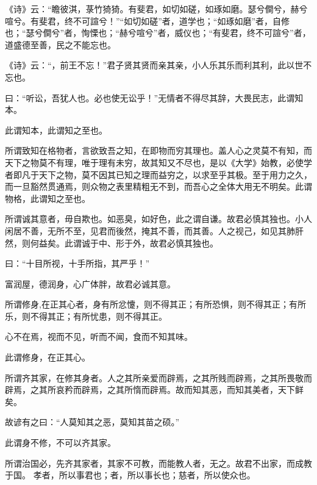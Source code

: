 \documentclass[twoside,openany]{book}
\begin{document}
\begin{pinyinscope}
《诗》云：“瞻彼淇，菉竹猗猗。有斐君，如切如磋，如琢如磨。瑟兮僴兮，赫兮喧兮。有斐君，终不可諠兮！”“如切如磋”者，道学也；“如琢如磨”者，自修也；“瑟兮僴兮”者，恂慄也；“赫兮喧兮”者，威仪也；“有斐君，终不可諠兮”者，道盛德至善，民之不能忘也。

《诗》云：“，前王不忘！”君子贤其贤而亲其亲，小人乐其乐而利其利，此以世不忘也。

曰：“听讼，吾犹人也。必也使无讼乎！”无情者不得尽其辞，大畏民志，此谓知本。

此谓知本，此谓知之至也。

所谓致知在格物者，言欲致吾之知，在即物而穷其理也。盖人心之灵莫不有知，而天下之物莫不有理，唯于理有未穷，故其知又不尽也，是以《大学》始教，必使学者即凡于天下之物，莫不因其已知之理而益穷之，以求至乎其极。至于用力之久，而一旦豁然贯通焉，则众物之表里精粗无不到，而吾心之全体大用无不明矣。此谓物格，此谓知之至也。

所谓诚其意者，毋自欺也。如恶臭，如好色，此之谓自谦。故君必慎其独也。小人闲居不善，无所不至，见君而後然，掩其不善，而其善。人之视己，如见其肺肝然，则何益矣。此谓诚于中、形于外，故君必慎其独也。

曰：“十目所视，十手所指，其严乎！”

富润屋，德润身，心广体胖，故君必诚其意。

所谓修身,在正其心者，身有所忿懥，则不得其正；有所恐惧，则不得其正；有所乐，则不得其正；有所忧患，则不得其正。

心不在焉，视而不见，听而不闻，食而不知其味。

此谓修身，在正其心。

所谓齐其家，在修其身者。人之其所亲爱而辟焉，之其所贱而辟焉，之其所畏敬而辟焉，之其所哀矜而辟焉，之其所惰而辟焉。故而知其恶，而知其美者，天下鲜矣。

故谚有之曰：“人莫知其之恶，莫知其苗之硕。”

此谓身不修，不可以齐其家。

所谓治国必，先齐其家者，其家不可教，而能教人者，无之。故君不出家，而成教于国。
孝者，所以事君也；者，所以事长也；慈者，所以使众也。


\end{pinyinscope}
\end{document}

